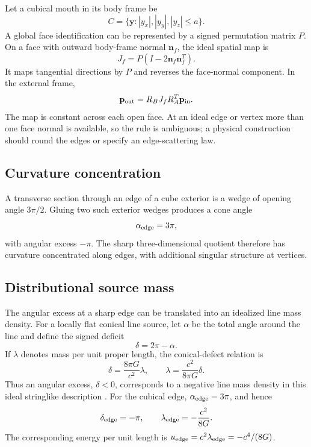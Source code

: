 \documentclass[journal,a4paper]{IEEEtran}
\begin{document}
Let a cubical mouth in its body frame be
\begin{equation}
    C=\{\mathbf y:|y_x|,|y_y|,|y_z|\leq a\}.
\end{equation}
A global face identification can be represented by a signed permutation matrix \(P\). On a face with outward body-frame normal \(\mathbf n_f\), the ideal spatial map is
\begin{equation}
    J_f=P(I-2\mathbf n_f\mathbf n_f^T).
    \label{eq:cube_map}
\end{equation}
It maps tangential directions by \(P\) and reverses the face-normal component. In the external frame,
\begin{equation}
    \mathbf p_{\rm out}=R_BJ_fR_A^T\mathbf p_{\rm in}.
\end{equation}
The map is constant across each open face. At an ideal edge or vertex more than one face normal is available, so the rule is ambiguous; a physical construction should round the edges or specify an edge-scattering law.

\subsection{Curvature concentration}

A transverse section through an edge of a cube exterior is a wedge of opening angle \(3\pi/2\). Gluing two such exterior wedges produces a cone angle
\begin{equation}
    \alpha_{\rm edge}=3\pi,
\end{equation}
with angular excess \(-\pi\). The sharp three-dimensional quotient therefore has curvature concentrated along edges, with additional singular structure at vertices.

\subsection{Distributional source mass}

The angular excess at a sharp edge can be translated into an idealized line
mass density.  For a locally flat conical line source, let \(\alpha\) be the
total angle around the line and define the signed deficit
\begin{equation}
    \delta=2\pi-\alpha.
\end{equation}
If \(\lambda\) denotes mass per unit proper length, the conical-defect
relation is
\begin{equation}
    \boxed{
    \delta=\frac{8\pi G}{c^2}\lambda,
    \qquad
    \lambda=\frac{c^2}{8\pi G}\delta.
    }
    \label{eq:deficit_line_density}
\end{equation}
Thus an angular excess, \(\delta<0\), corresponds to a negative line mass
density in this ideal stringlike description \cite{Vilenkin1981,Visser1995}.
For the cubical edge, \(\alpha_{\rm edge}=3\pi\), and hence
\begin{equation}
    \delta_{\rm edge}=-\pi,
    \qquad
    \lambda_{\rm edge}=-\frac{c^2}{8G}.
    \label{eq:cube_edge_density}
\end{equation}
The corresponding energy per unit length is
\(u_{\rm edge}=c^2\lambda_{\rm edge}=-c^4/(8G)\).
\end{document}
